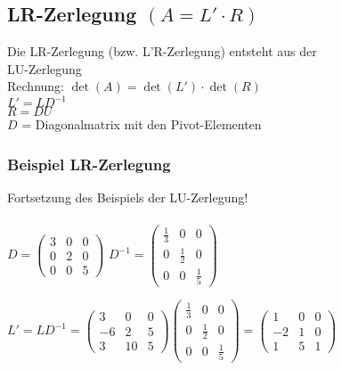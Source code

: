 		    
		    
		    
		    \subsection{LR-Zerlegung $(A = L' \cdot R)$}
		    Die LR-Zerlegung (bzw. L'R-Zerlegung)  entsteht aus der \\
		    LU-Zerlegung \\
		    
		    Rechnung: \quad  $\det(A) =  \det(L') \cdot \det(R)$ \\ 
			$L' = L D^{-1} $ \\
			$R = DU$ \\
			$D$ = Diagonalmatrix mit den Pivot-Elementen 
			
			
			\subsubsection{Beispiel LR-Zerlegung}
			Fortsetzung des Beispiels der LU-Zerlegung! \\
			\\
			$D = \begin{pmatrix} 3 & 0 & 0 \\ 0 & 2 & 0 \\ 0 & 0 & 5  \end{pmatrix}$ \quad $D^{-1} = \begin{pmatrix} \frac{1}{3} & 0 & 0 \\ 0 & \frac{1}{2} & 0 \\ 0 & 0 & \frac{1}{5}  \end{pmatrix}$ \\
			
			\vspace{0.3cm}
			
			$L' = L D^{-1} = \begin{pmatrix} 3 & 0 & 0 \\ -6 & 2 & 5 \\ 3 & 10 & 5   \end{pmatrix}  \begin{pmatrix} \frac{1}{3} & 0 & 0 \\ 0 & \frac{1}{2} & 0 \\ 0 & 0 & \frac{1}{5}  \end{pmatrix} = \begin{pmatrix} 1 & 0 & 0 \\ -2 & 1 & 0 \\ 1 & 5 & 1   \end{pmatrix}$ \\
			
